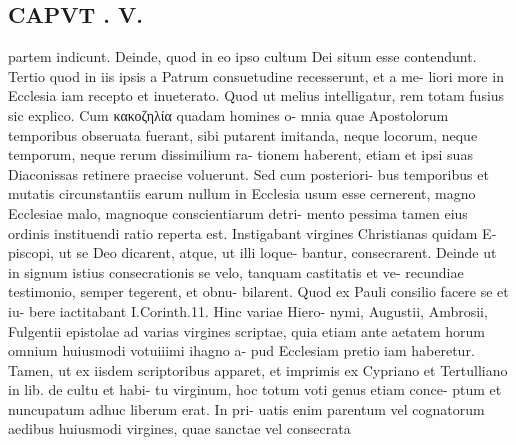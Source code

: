 \documentclass{article}
\begin{document}
\begin{pages}
\section*{CAPVT . V. }
\marginpar{[ p.291 ]}partem indicunt. Deinde, quod in eo ipso cultum Dei situm esse contendunt. Tertio quod in iis ipsis a Patrum consuetudine recesserunt, et a me- liori more in Ecclesia iam recepto et inueterato. Quod ut melius intelligatur, rem totam fusius sic explico. Cum κακοζηλία quadam homines o- mnia quae Apostolorum temporibus obseruata fuerant, sibi putarent imitanda, neque locorum, neque temporum, neque rerum dissimilium ra- tionem haberent, etiam et ipsi suas Diaconissas retinere praecise voluerunt. Sed cum posteriori- bus temporibus et mutatis circunstantiis earum nullum in Ecclesia usum esse cernerent, magno Ecclesiae malo, magnoque conscientiarum detri- mento pessima tamen eius ordinis instituendi ratio reperta est. Instigabant virgines Christianas quidam E- piscopi, ut se Deo dicarent, atque, ut illi loque- bantur, consecrarent. Deinde ut in signum istius consecrationis se velo, tanquam castitatis et ve- recundiae testimonio, semper tegerent, et obnu- bilarent. Quod ex Pauli consilio facere se et iu- bere iactitabant I.Corinth.11. Hinc variae Hiero- nymi, Augustii, Ambrosii, Fulgentii epistolae ad varias virgines scriptae, quia etiam ante aetatem horum omnium huiusmodi votuiiimi ihagno a- pud Ecclesiam pretio iam haberetur. Tamen, ut ex iisdem scriptoribus apparet, et imprimis ex Cypriano et Tertulliano in lib. de cultu et habi- tu virginum, hoc totum voti genus etiam conce- ptum et nuncupatum adhuc liberum erat. In pri- uatis enim parentum vel cognatorum aedibus huiusmodi virgines, quae sanctae vel consecrata 

\end{pages}
\end{document}
